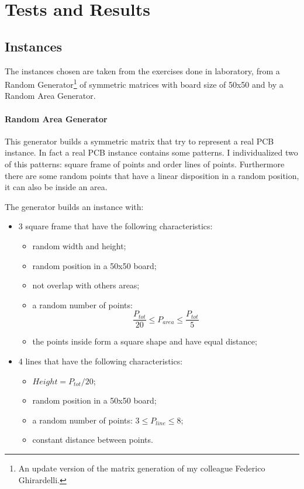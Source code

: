 \section{Tests and Results}

\subsection{Instances}
	The instances chosen are taken from the exercises done in laboratory, from a Random Generator\footnote{An update version of the matrix generation of my colleague Federico Ghirardelli.} of symmetric matrices with board size of 50x50 and by a Random Area Generator. 
	
	
	\paragraph{Random Area Generator} This generator builds a symmetric matrix that try to represent a real PCB instance. In fact a real PCB instance contains some patterns. I individualized two of this patterns: square frame of points and order lines of points. Furthermore there are some random points that have a linear disposition in a random position, it can also be inside an area. 
	
	The generator builds an instance with:
	\begin{itemize}
		\item 3 square frame that have the following characteristics:
			\begin{itemize}
				\item random width and height;
				\item random position in a 50x50 board;
				\item not overlap with others areas;
				\item a random number of points:
				\begin{equation*}
					\frac{P_{tot}}{20} \leq P_{area} \leq \frac{P_{tot}}{5}  
				\end{equation*}
				\item the points inside form a square shape and have equal distance;
			\end{itemize}
		\item 4 lines that have the following characteristics:
			\begin{itemize}
				\item $Height = P_{tot} / 20$;
				\item random position in a 50x50 board;
				\item a random number of points: $3 \leq P_{line} \leq 8$;
				\item constant distance between points.
			\end{itemize}
	\end{itemize}

